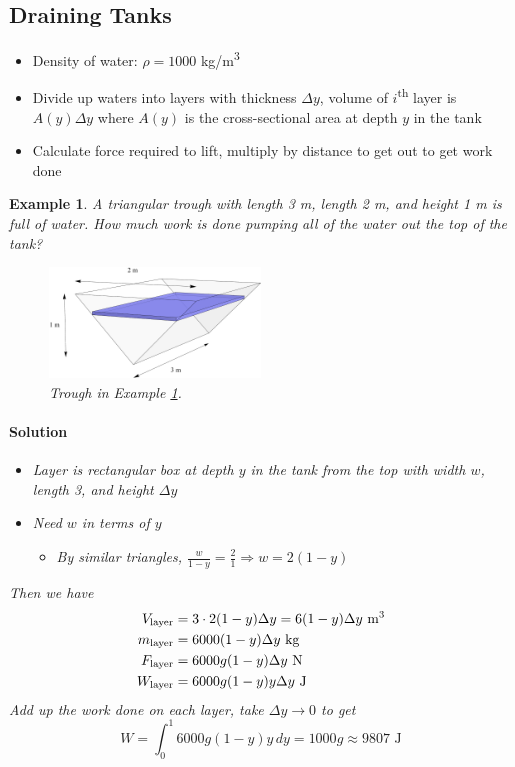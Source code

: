 \documentclass[letterpaper, 11pt, openany]{book}
\theoremstyle{mytheoremstyle}
\theoremstyle{myexamplestyle}
\newtheorem{example}{Example}[section]
\newenvironment{solution}{\paragraph{\sffamily \smaller \fontseries{b}\selectfont Solution}}{\hfill\faSquare}
\begin{document}
\subsection{Draining Tanks}
\begin{itemize}
       \item Density of water: $\rho = 1000$ kg/m\textsuperscript{3}
       \item Divide up waters into layers with thickness $\Delta y$, volume of $i$\textsuperscript{th} layer is $A(y) \Delta y$ where $A(y)$ is the cross-sectional area at depth $y$ in the tank
       \item Calculate force required to lift, multiply by distance to get out to get work done
\end{itemize}

\begin{example}
    \label{e:worktriangletrough}A triangular trough with length 3 m, length 2 m, and height 1 m is full of water. How much work is done pumping all of the water out the top of the tank?       
    \begin{figure}[htbp]
        \centering
        \includegraphics[width=0.5\textwidth]{Figures/prismtank.png}
        \caption{Trough in Example \ref{e:worktriangletrough}.}
        \label{f:worktriangletrough}
    \end{figure}
    
    \begin{solution}
        \begin{itemize}
            \item Layer is rectangular box at depth $y$ in the tank from the top with width $w$, length 3, and height $\Delta y$
            \item Need $w$ in terms of $y$
            \begin{itemize}
                \item By similar triangles, $\frac{w}{1-y} = \frac{2}{1} \Rightarrow w = 2(1-y)$
            \end{itemize}
        \end{itemize}
        Then we have
        \begin{align*}
            V_{\text{layer}} &= 3 \cdot 2(1-y)\Delta y = 6(1-y)\Delta y \text{ m\textsuperscript{3}}\\
            m_{\text{layer}} &= 6000(1-y)\Delta y \text{ kg}\\
            F_{\text{layer}} &= 6000g(1-y)\Delta y \text{ N}\\
            W_{\text{layer}} &= 6000g(1-y)y \Delta y \text{ J}
        \end{align*}
        Add up the work done on each layer, take $\Delta y \to 0$ to get
        \[
            W = \int_{0}^{1} 6000g(1-y)y \, dy = 1000g \approx 9807 \text{ J}
        \]
    \end{solution}
\end{example}
\end{document}
